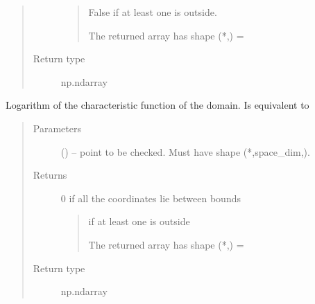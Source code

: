 \documentclass[letterpaper,10pt,english,openany,oneside]{sphinxmanual}
\begin{document}
\begin{fulllineitems}
\begin{fulllineitems}
\begin{quote}
\begin{description}
\begin{quote}
False if at least one is outside.

The returned array has shape (*,) = 
\end{quote}


\item[{Return type}] \leavevmode
np.ndarray

\end{description}\end{quote}

\end{fulllineitems}


\begin{fulllineitems}
\label{\detokenize{autogen:model.Model.log_chi}}
Logarithm of the characteristic function of the domain.
Is equivalent to

\begin{sphinxVerbatim}[commandchars=\\\{\}]
\end{sphinxVerbatim}
\begin{quote}\begin{description}
\item[{Parameters}] \leavevmode
{} () – point to be checked. Must have shape (*,space\_dim,).

\item[{Returns}] \leavevmode

0 if all the coordinates lie between bounds
\begin{quote}

\sphinxhyphen{} if at least one is outside

The returned array has shape (*,) = 
\end{quote}


\item[{Return type}] \leavevmode
np.ndarray


\end{description}
\end{quote}
\end{fulllineitems}
\end{fulllineitems}
\end{document}
